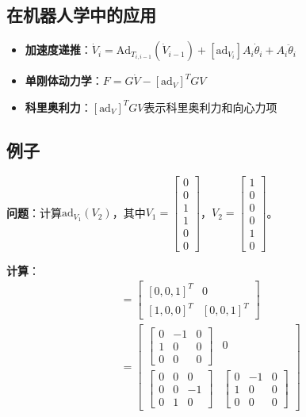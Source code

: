 \documentclass[12pt,a4paper]{article}
\begin{document}
\subsection{在机器人学中的应用}

\begin{itemize}
\item \textbf{加速度递推}：$\dot{V}_i = \text{Ad}_{T_{i,i-1}}(\dot{V}_{i-1}) + [\text{ad}_{V_i}] A_i \dot{\theta}_i + A_i \ddot{\theta}_i$
\item \textbf{单刚体动力学}：$F = G \dot{V} - [\text{ad}_V]^T G V$
\item \textbf{科里奥利力}：$[\text{ad}_V]^T G V$表示科里奥利力和向心力项
\end{itemize}

\subsection{例子}

\textbf{问题}：计算$\text{ad}_{V_1}(V_2)$，其中$V_1 = \begin{bmatrix} 0 \\ 0 \\ 1 \\ 1 \\ 0 \\ 0 \end{bmatrix}$，$V_2 = \begin{bmatrix} 1 \\ 0 \\ 0 \\ 0 \\ 1 \\ 0 \end{bmatrix}$。

\textbf{计算}：
\begin{align}
[\text{ad}_{V_1}] &= \begin{bmatrix} [0,0,1]^T & 0 \\ [1,0,0]^T & [0,0,1]^T \end{bmatrix} \\
&= \begin{bmatrix} 
\begin{bmatrix} 0 & -1 & 0 \\ 1 & 0 & 0 \\ 0 & 0 & 0 \end{bmatrix} & 0 \\
\begin{bmatrix} 0 & 0 & 0 \\ 0 & 0 & -1 \\ 0 & 1 & 0 \end{bmatrix} & 
\begin{bmatrix} 0 & -1 & 0 \\ 1 & 0 & 0 \\ 0 & 0 & 0 \end{bmatrix}
\end{bmatrix}
\end{align}
\end{document}
